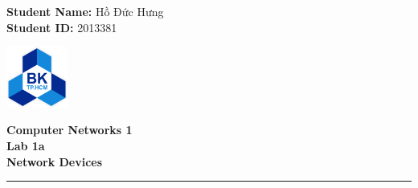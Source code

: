 \documentclass[a4paper, 13pt]{article}
\begin{document}
\pagestyle{plain}

\begin{flushleft}
\textbf{Student Name:} Hồ Đức Hưng\\
\textbf{Student ID:} 2013381
\end{flushleft}

\begin{flushright}\vspace{-15mm}
\includegraphics[height=2cm]{logo.png}
\end{flushright}
 
\begin{center}\vspace{-1cm}
\textbf{\large Computer Networks 1}\\
\textbf{Lab 1a} \\
\vspace{0.3cm}
\textbf{\large Network Devices}
\end{center}


 
\rule{\linewidth}{0.1mm}

\bigskip
\bigskip

\begin{enumerate}



\end{enumerate}
\end{document}
